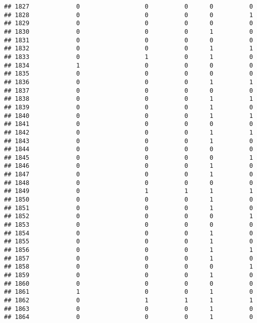 \documentclass[
]{article}
\begin{document}
\begin{verbatim}
## 1827             0                  0          0      0          0
## 1828             0                  0          0      0          1
## 1829             0                  0          0      0          0
## 1830             0                  0          0      1          0
## 1831             0                  0          0      0          0
## 1832             0                  0          0      1          1
## 1833             0                  1          0      1          0
## 1834             1                  0          0      0          0
## 1835             0                  0          0      0          0
## 1836             0                  0          0      1          1
## 1837             0                  0          0      0          0
## 1838             0                  0          0      1          1
## 1839             0                  0          0      1          0
## 1840             0                  0          0      1          1
## 1841             0                  0          0      0          0
## 1842             0                  0          0      1          1
## 1843             0                  0          0      1          0
## 1844             0                  0          0      0          0
## 1845             0                  0          0      0          1
## 1846             0                  0          0      1          0
## 1847             0                  0          0      1          0
## 1848             0                  0          0      0          0
## 1849             0                  1          1      1          1
## 1850             0                  0          0      1          0
## 1851             0                  0          0      1          0
## 1852             0                  0          0      0          1
## 1853             0                  0          0      0          0
## 1854             0                  0          0      1          0
## 1855             0                  0          0      1          0
## 1856             0                  0          0      1          1
## 1857             0                  0          0      1          0
## 1858             0                  0          0      0          1
## 1859             0                  0          0      1          0
## 1860             0                  0          0      0          0
## 1861             1                  0          0      1          0
## 1862             0                  1          1      1          1
## 1863             0                  0          0      1          0
## 1864             0                  0          0      1          0

\end{verbatim}
\end{document}
